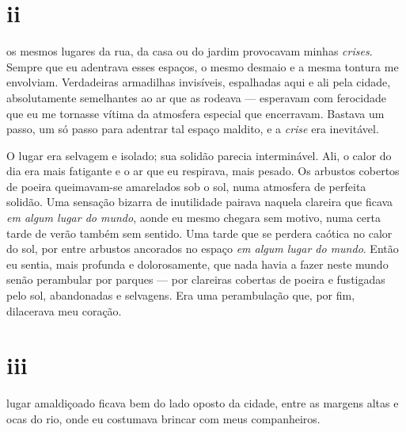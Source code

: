 \section{ii}

 os mesmos lugares da rua, da casa ou do jardim provocavam
 minhas \textit{crises}. Sempre que eu adentrava esses espaços, o mesmo
 desmaio e a mesma tontura me envolviam. Verdadeiras armadilhas invisíveis,
 espalhadas aqui e ali pela cidade, absolutamente semelhantes ao ar que as
 rodeava --- esperavam com ferocidade que eu me tornasse vítima da atmosfera
 especial que encerravam. Bastava um passo, um só passo para adentrar tal
 espaço maldito, e a \textit{crise} era inevitável.


O lugar era selvagem e isolado; sua solidão parecia interminável. Ali, o calor
do dia era mais fatigante e o ar que eu respirava, mais pesado. Os arbustos
cobertos de poeira queimavam-se amarelados sob o sol, numa atmosfera de
perfeita solidão. Uma sensação bizarra de inutilidade pairava naquela
clareira que ficava \textit{em algum lugar do mundo}, aonde eu mesmo chegara
sem motivo, numa certa tarde de verão também sem sentido. Uma tarde que se
perdera caótica no calor do sol, por entre arbustos ancorados no
espaço \textit{em algum lugar do mundo}. Então eu sentia, mais profunda e
dolorosamente, que nada havia a fazer neste mundo senão perambular por
parques --- por clareiras cobertas de poeira e fustigadas pelo sol,
abandonadas e selvagens. Era uma perambulação que, por fim, dilacerava meu
coração.


\section{iii} 

 lugar amaldiçoado ficava bem do lado oposto da cidade, entre
 as margens altas e ocas do rio, onde eu costumava brincar com meus
 companheiros.

